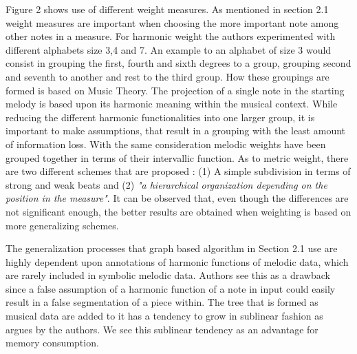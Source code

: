 \documentclass{llncs}
\begin{document}
\begin{itemize}
			Figure 2 shows use of different weight measures. As mentioned in section 2.1 weight measures are important when choosing the more important note among other notes in a measure. For harmonic weight the authors experimented with different alphabets size 3,4 and 7. An example to an alphabet of size 3 would consist in grouping the first, fourth and sixth degrees to a group, grouping second and seventh to another and rest to the third group. How these groupings are formed is based on Music Theory. The projection of a single note in the starting melody is based upon its harmonic meaning within the musical context. While reducing the different harmonic functionalities into one larger group, it is important to make assumptions, that result in a grouping with the least amount of information loss. With the same consideration melodic weights have been grouped together in terms of their intervallic function. As to metric weight, there are two different schemes that are proposed : (1) A simple subdivision in terms of strong and weak beats and (2) \textit{"a hierarchical organization depending on the position in the measure"}. It can be observed that, even though the differences are not significant enough, the better results are obtained when weighting is based on more generalizing schemes.
			
				The generalization processes that graph based algorithm in Section 2.1 use are highly dependent upon annotations of harmonic functions of melodic data, which are rarely included in symbolic melodic data. Authors see this as a drawback since a false assumption of a harmonic function of a note in input could easily result in a false segmentation of a piece within. The tree that is formed as musical data are added to it has a tendency to grow in sublinear fashion as argues by the authors. We see this sublinear tendency as an advantage for memory consumption.


\end{itemize}
\end{document}

